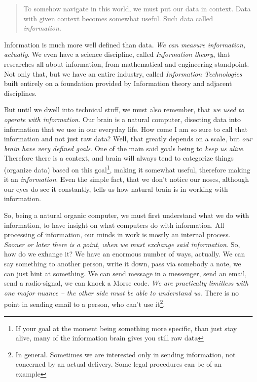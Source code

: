 \documentclass{article}
\begin{document}
            \begin{quote}
                To somehow navigate in this world, we must put our data in context. Data with given context becomes somewhat useful. Such data called \emph{information}.
            \end{quote}

            Information is much more well defined than data. \emph{We can measure information, actually}. We even have a science discipline, called \emph{Information theory},
            that researches all about information, from mathematical and engineering standpoint. Not only that, but we have an entire industry, called \emph{Information Technologies}
            built entirely on a foundation provided by Information theory and adjacent disciplines.\par
            
            But until we dwell into technical stuff, we must also remember, that \emph{we used to operate with information}. Our brain is a natural computer, disecting data
            into information that we use in our everyday life. How come I am so sure to call that information and not just raw data? Well, that greatly depends on a 
            scale, but
            \emph{our brain have very defined goals}. One of the main said goals being to \emph{keep us alive}. Therefore there is a context, and brain will always tend to 
            categorize things (organize data) based on this goal\footnote{If your goal at the moment being something more specific, than just stay alive, many of the information brain gives you still raw data},
            making it somewhat useful, therefore making it an \emph{information}. Even the simple fact, that we don't notice our noses, although our eyes do see it constantly, 
            tells us how natural brain is in working with information. \par
            
            So, being a natural organic computer, we must first understand what we do with information, to have insight on what computers do with information. All processing 
            of information, our minds in work is mostly an internal process. \emph{Sooner or later there is a point, when we must exchange said information}. So, how do we
            exhange it? We have an enormous number of ways, actually. We can say something to another person, write it down, pass via somebody a note, we can just hint at something.
            We can send message in a messenger, send an email, send a radio-signal, we can knock a Morse code. \emph{We are practically limitless with one major nuance -- the other
            side must be able to understand us}. There is no point in sending email to a person, who can't use it\footnote{In general. Sometimes we are interested only
            in sending information, not concerned by an actual delivery. Some legal procedures can be of an example}. \par
\end{document}
